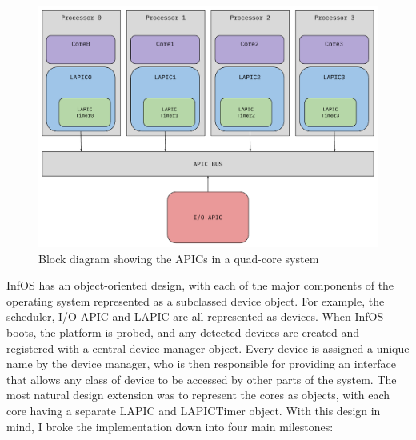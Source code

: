 \documentclass[bsc,frontabs,singlespacing,parskip,deptreport]{infthesis}
\begin{document}
\begin{figure}[h]
    \centering
    \includegraphics[scale=0.6]{figures/cores-lapics.pdf}
    \caption{Block diagram showing the APICs in a quad-core system}
    \label{cores-lapics}
\end{figure}


InfOS has an object-oriented design, with each of the major components of the operating system represented as a subclassed device object. For example, the scheduler, I/O APIC and LAPIC are all represented as devices. When InfOS boots, the platform is probed, and any detected devices are created and registered with a central device manager object. Every device is assigned a unique name by the device manager, who is then responsible for providing an interface that allows any class of device to be accessed by other parts of the system. The most natural design extension was to represent the cores as objects, with each core having a separate LAPIC and LAPICTimer object. With this design in mind, I broke the implementation down into four main milestones:
\end{document}
